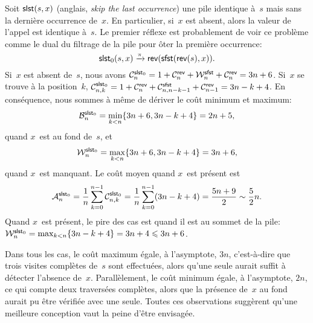 Soit \(\fun{slst}(s,x)\) (anglais, \emph{skip
  the last occurrence}) une pile identique à~\(s\) mais sans la
dernière occurrence de~\(x\). En particulier, si~\(x\) est absent,
alors la valeur de l'appel est identique à~\(s\). Le premier réflexe
est probablement de voir ce problème comme le dual du filtrage de la
pile pour ôter la première occurrence:
\begin{equation}
  \fun{slst}_0(s,x) \xrightarrow{\smash{\pi}}
                  \fun{rev}(\fun{sfst}(\fun{rev}(s),x)).
\label{eq:slst0}
\end{equation}
Si~\(x\) est absent de~\(s\), nous avons
\(\C{\fun{slst}_0}{n} = 1 + \C{\fun{rev}}{n} + \W{\fun{sfst}}{n} +
\C{\fun{rev}}{n} = 3n+6\). Si~\(x\) se trouve à la position~\(k\),
\(\C{\fun{slst}_0}{n,k} = 1 + \C{\fun{rev}}{n} +
\C{\fun{sfst}}{n,n-k-1} + \C{\fun{rev}}{n-1} = 3n - k + 4\). En
conséquence, nous sommes à même de dériver le coût minimum et
maximum:
\begin{equation*}
\abovedisplayskip=0pt
\belowdisplayskip=0pt
\B{\fun{slst}_0}{n} = \min_{k < n}\{3n+6,3n-k+4\} = 2n + 5,
\end{equation*}
quand \(x\)~est au fond de~\(s\), et
\begin{equation*}
\abovedisplayskip=0pt
\belowdisplayskip=0pt
\W{\fun{slst}_0}{n} = \max_{k < n}\{3n+6,3n-k+4\} = 3n+6,
\end{equation*}
quand \(x\)~est manquant.  Le coût
moyen quand \(x\)~est présent est
\begin{equation*}
\M{\fun{slst}_0}{n} =
\frac{1}{n}\sum_{k=0}^{n-1}\C{\fun{slst}_0}{n,k} =
\frac{1}{n}\sum_{k=0}^{n-1}(3n - k + 4) = \frac{5n+9}{2} \sim
\frac{5}{2}n.
\end{equation*}
Quand \(x\)~est présent, le pire des cas est quand il est au sommet de
la pile: \(\W{\fun{slst}_0}{n} = \max_{k<n}\{3n - k + 4\} = 3 n+ 4
\leqslant 3n + 6\).

Dans tous les cas, le coût maximum égale, à l'asymptote, \(3n\),
c'est-à-dire que trois visites complètes de~\(s\) sont effectuées,
alors qu'une seule aurait suffit à détecter l'absence
de~\(x\). Parallèlement, le coût minimum égale, à l'asymptote, \(2n\),
ce qui compte deux traversées complètes, alors que la présence
de~\(x\) au fond aurait pu être vérifiée avec une seule. Toutes ces
observations suggèrent qu'une meilleure conception vaut la peine
d'être envisagée.

